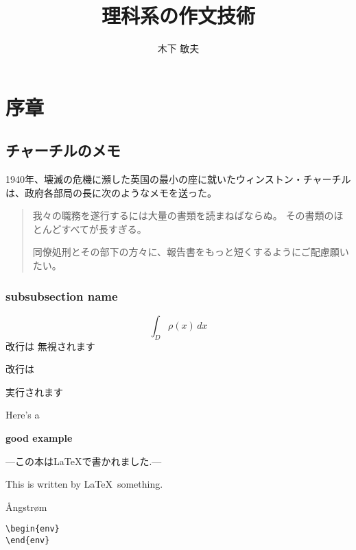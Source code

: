\documentclass{jsarticle}
\begin{document}
\title{理科系の作文技術}
\author{木下 敏夫}
\date{}
\maketitle
\begin{abstract}

\end{abstract}

\section{序章}
\subsection{チャーチルのメモ}
1940年、壊滅の危機に瀕した英国の最小の座に就いたウィンストン・チャーチルは、政府各部局の長に次のようなメモを送った。
\begin{quotation}
我々の職務を遂行するには大量の書類を読まねばならぬ。
その書類のほとんどすべてが長すぎる。

同僚処刑とその部下の方々に、報告書をもっと短くするようにご配慮願いたい。
\end{quotation}
\subsubsection{subsubsection name}
\[\int_D \rho (x) \, dx \]
改行は
無視されます

改行は

実行されます

Here's a

\textbf{good example}

---この本は\LaTeX で書かれました.---

This is written by \LaTeX\ something.

\AA ngstr\o m

\begin{verbatim}
\begin{env}
\end{env}
\end{verbatim}
\end{document}
